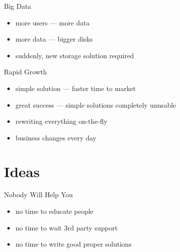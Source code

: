 \documentclass[aspectratio=169]{beamer}
\begin{document}
\begin{frame}{Big Data}
    \begin{itemize}
        \item more users --- more data
        \item more data --- bigger disks
        \item suddenly, new storage solution required
    \end{itemize}
\end{frame}

\begin{frame}{Rapid Growth}
    \begin{itemize}
        \item simple solution --- faster time to market
        \item great success --- simple solutions completely unusable
        \item rewriting everything on-the-fly
        \item business changes every day
    \end{itemize}
\end{frame}

\section{Ideas}
{
\begin{frame}[plain]{}
\end{frame}
}
\begin{frame}{Nobody Will Help You}
    \begin{itemize}
        \item no time to educate people
        \item no time to wait 3rd party support
        \item no time to write good proper solutions
    \end{itemize}
\end{frame}
\end{document}
